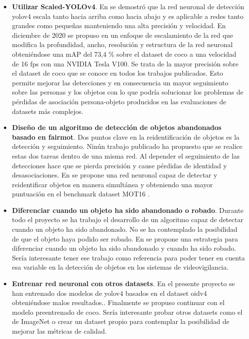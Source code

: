 \begin{itemize}
    \item \textbf{Utilizar Scaled-YOLOv4}. En \cite{bochkovskiy2020yolov4} se demostró que la red neuronal de detección \gls{yolov4} escala tanto hacia arriba como hacia abajo y es aplicable a redes tanto grandes como pequeñas manteniendo una alta precisión y velocidad. En diciembre de 2020 se propuso en \cite{wang2021scaledyolov4} un enfoque de escalamiento de la red que modifica la profundidad, ancho, resolución y estructura de la red neuronal obteniéndose una mAP del 73,4 \% sobre el dataset de \gls{coco} a una velocidad de 16 \gls{fps} con una NVIDIA Tesla V100. Se trata de la mayor precisión sobre el dataset de \gls{coco} que se conoce en todos los trabajos publicados. Esto permite mejorar las detecciones y en consecuencia un mayor seguimiento sobre las personas y los objetos con lo que podría solucionar los problemas de pérdidas de asociación persona-objeto producidos en las evaluaciones de datasets más complejos.
    \item \textbf{Diseño de un algoritmo de detección de objetos abandonados basado en \gls{fairmot}}. Dos puntos clave en la reidentificación de objetos es la detección y seguimiento. Ninún trabajo publicado ha propuesto que se realice estas dos tareas dentro de una misma red. Al depender el seguimiento de las detecciones hace que se pierda precisión y cause pérdidas de identidad y desasociaciones. En \cite{zhang2020fair} se propone una red neuronal capaz de detectar y reidentificar objetos en manera simultánea y obteniendo una mayor puntuación en el benchmark dataset MOT16 \cite{milan2016mot16}.
    \item \textbf{Diferenciar cuando un objeto ha sido abandonado o robado}. Durante todo el proyecto se ha trabajo el desarrollo de un algoritmo capaz de detectar cuando un objeto ha sido abandonado. No se ha contemplado la posibilidad de que el objeto haya podido ser robado. En \cite{9079525} se propone una estrategia para diferenciar cuando un objeto ha sido abandonado y cuando ha sido robado. Sería interesante tener ese trabajo como referencia para poder tener en cuenta esa variable en la detección de objetos en los sistemas de videovigilancia.
    \item \textbf{Entrenar red neuronal con otros datasets}. En el presente proyecto se han entrenado dos modelos de \gls{yolov4} basados en el dataset \gls{oidv4} obteniéndose malos resultados.. Finalmente se propuso continuar con el modelo preentrenado de \gls{coco}. Sería interesante probar otros datasets como el de ImageNet \cite{russakovsky2015imagenet} o crear un dataset propio para contemplar la posibilidad de mejorar las métricas de calidad.

\end{itemize}
